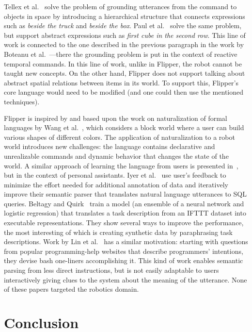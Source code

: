 \documentclass[letterpaper, 10 pt, conference]{ieeeconf}  %
\newcommand{\tool}{Flipper\xspace}
\begin{document}
Tellex et al.~\cite{tellexGrounding} solve the problem of grounding utterances
from the command to objects in space by introducing a hierarchical structure
that connects expressions such as \emph{beside the truck} and \emph{beside the
box}. Paul et al.~\cite{paulGrounding} solve the same problem, but support
abstract expressions such as \emph{first cube in the second row}. This line of
work is connected to the one described in the previous paragraph in the work by
Boteanu et al.~\cite{boteanuVerifiableGrounding}---there the grounding
problem is put in the context of reactive temporal commands. In this line of
work, unlike in \tool, the robot cannot be taught new concepts. On the other hand,
\tool does not support talking about abstract spatial relations between items
in its world. To support this, \tool's core language would need to be modified
(and one could then use the mentioned techniques).

\tool is inspired by and based upon the work on naturalization of formal
languages by Wang et al.~\cite{wangVoxelurn}, which considers
a block world where a user can build various shapes of different
colors. The application of naturalization to a robot world introduces new
challenges: the language contains declarative and unrealizable
commands and dynamic behavior that changes the state of the world.
A similar approach of learning the language from users is presented in~\cite{azariaLia}, but in the context of personal
assistants. 
Iyer et al.~\cite{iyerLearningNeuralSemanticParser} use user's feedback to 
minimize the effort needed for additional annotation of data and iteratively improve their semantic parser 
that translates natural language utterances to SQL queries. 
Beltagy and Quirk~\cite{beltagyIFTT} train a model (an ensemble of a neural network and logistic
regression) that translates a task description from an IFTTT dataset into
executable representations. They show several ways to improve the performance, the
most interesting of which is creating synthetic data by paraphrasing task
descriptions. Work by Lin et al.~\cite{linTelina} has a similar motivation:
starting with questions from popular programming-help websites that describe
programmers' intentions, they devise bash one-liners accomplishing it. 
This kind of work enables semantic parsing from 
less direct instructions, but is not easily adaptable to users interactively giving clues to the 
system about the meaning of the utterance.
None of these papers targeted the robotics domain.


\section{Conclusion}
\end{document}
